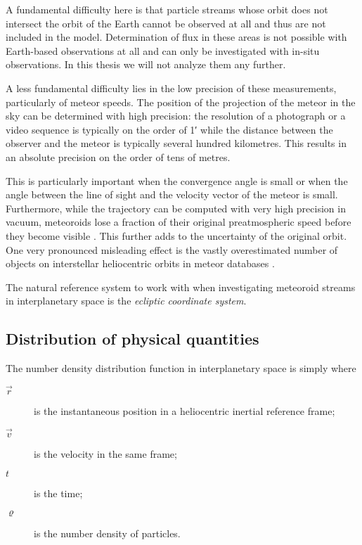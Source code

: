     A fundamental difficulty here is that particle streams whose orbit does not intersect
    the orbit of the Earth cannot be observed at all and thus are not included in the model.
    Determination of flux in these areas is not possible with Earth-based observations at all
    and can only be investigated with in-situ observations. In this thesis we will not analyze them any further.

    A less fundamental difficulty lies in the low precision of these measurements, particularly of meteor speeds.
    The position of the projection of the meteor in the sky can be determined with high precision:
    the resolution of a photograph or a video sequence is typically on the order of \ang{;1;}
    while the distance between the observer and the meteor is typically several hundred kilometres.
    This results in an absolute precision on the order of tens of metres.

    This is particularly important when the convergence angle is small \citep{ceplecha1987} or when the angle between
    the line of sight and the velocity vector of the meteor is small.
    Furthermore, while the trajectory can be computed with very high precision in vacuum,
    meteoroids lose a fraction of their original preatmospheric speed before they become visible \citep{vida+2018}.
    This further adds to the uncertainty of the original orbit.
    One very pronounced misleading effect is the vastly overestimated number of objects
    on interstellar heliocentric orbits in meteor databases \cite{hajdukovajr1994}.

    The natural reference system to work with when investigating meteoroid streams in interplanetary space
    is the \emph{ecliptic coordinate system}.

    \subsection{Distribution of physical quantities} \label{mod}
        The number density distribution function in interplanetary space is simply
        where
        \begin{description}
            \item[$\vec{r}$]    is the instantaneous position in a heliocentric inertial reference frame;
            \item[$\vec{v}$]    is the velocity in the same frame;
            \item[$t$]          is the time;
            \item[$\varrho$]    is the number density of particles.
        \end{description}

